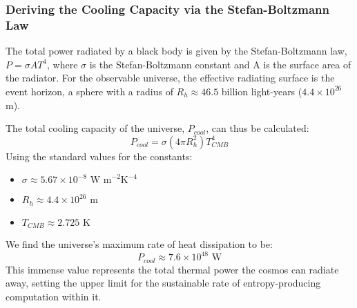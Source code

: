 \documentclass[12pt, aip, jcp]{revtex4-2} %
\begin{document}
\subsubsection{Deriving the Cooling Capacity via the Stefan-Boltzmann Law}

The total power radiated by a black body is given by the Stefan-Boltzmann law, \(P = \sigma A T^4\), where \(\sigma\) is the Stefan-Boltzmann constant and A is the surface area of the radiator. For the observable universe, the effective radiating surface is the event horizon, a sphere with a radius of \(R_h \approx 46.5\) billion light-years (\(4.4 \times 10^{26}\) m).

The total cooling capacity of the universe, \(P_{cool}\), can thus be calculated:
\begin{equation}
    P_{cool} = \sigma (4 \pi R_h^2) T_{CMB}^4
\end{equation}
Using the standard values for the constants:
\begin{itemize}
    \item \(\sigma \approx 5.67 \times 10^{-8} \text{ W m}^{-2} \text{K}^{-4}\)
    \item \(R_h \approx 4.4 \times 10^{26} \text{ m}\)
    \item \(T_{CMB} \approx 2.725 \text{ K}\)
\end{itemize}
We find the universe's maximum rate of heat dissipation to be:
\begin{equation}
    P_{cool} \approx 7.6 \times 10^{48} \text{ W}
\end{equation}
This immense value represents the total thermal power the cosmos can radiate away, setting the upper limit for the sustainable rate of entropy-producing computation within it.
\end{document}
